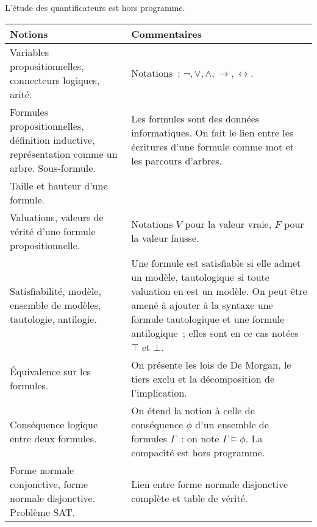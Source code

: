 L'étude des quantificateurs est hors programme.

\begin{longtable}{|p{\lnotion}|p{\comment}|}
    \hline
    \textbf{Notions} & \textbf{Commentaires} \\
    \hline \hline
    Variables propositionnelles, connecteurs logiques, arité. & 
    Notations~: $\neg, \vee, \wedge, \rightarrow, \leftrightarrow$.
    \\
    Formules propositionnelles, définition inductive, représentation comme un arbre. Sous-formule.
    & Les formules sont des données informatiques. On fait le lien entre les écritures d'une formule comme mot et les parcours d'arbres.
    \\
    Taille et hauteur d'une formule. & 
    \\
    \hline 
    Valuations, valeurs de vérité d'une formule 
    propositionnelle.
    & Notations $V$ pour la valeur vraie, $F$ pour la valeur fausse.
  \\
    Satisfiabilité, modèle, ensemble de modèles, tautologie, antilogie. & Une formule est satisfiable si elle admet un modèle, tautologique si toute valuation en est un modèle. On peut être amené à ajouter à la syntaxe une formule tautologique et une formule antilogique~; elles sont en ce cas notées $\top$ et $\bot$. 
    \\
    \'Equivalence sur les formules. & On présente les lois de De Morgan, le tiers exclu
    et la décomposition de l'implication. 
    \\
    Conséquence logique entre deux formules. & On étend la notion à celle de conséquence $\phi$ d'un ensemble de formules $\Gamma$~: on note $\Gamma\models\phi$. La compacité est hors programme. 
    \\
    \hline
    Forme normale conjonctive, forme normale disjonctive. Problème SAT.
    & Lien entre forme normale disjonctive complète et table de vérité. 
    \\
    \hline
\end{longtable}


